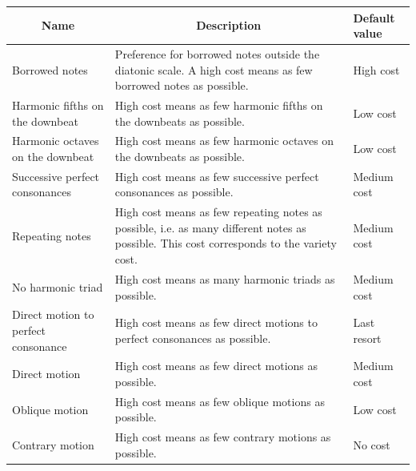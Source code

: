 \begin{table}[h!]
    \footnotesize
    \begin{adjustbox}{center}
        \begin{tabular}{|m{}|m{}|m{}<{\centering}|}
        \hline
        \multicolumn{1}{|c|}{\textbf{Name}} &
          \multicolumn{1}{c|}{\textbf{Description}} &
          \textbf{Default value} \\ \hline
        \cellcolor[HTML]{C8D6FF}Borrowed notes &
          Preference for borrowed notes outside the diatonic scale. A high cost means as few borrowed notes as possible. &
          High cost \\ \hline
        \cellcolor[HTML]{C8D6FF}Harmonic fifths on the downbeat &
          High cost means as few harmonic fifths on the downbeats as possible. &
          Low cost \\ \hline
        \cellcolor[HTML]{C8D6FF}Harmonic octaves on the downbeat &
          High cost means as few harmonic octaves on the downbeats as possible. &
          Low cost \\ \hline
        \cellcolor[HTML]{C8D6FF}Successive perfect consonances &
          High cost means as few successive perfect consonances as possible.&
          Medium cost \\ \hline
        \cellcolor[HTML]{C8D6FF}Repeating notes &
          High cost means as few repeating notes as possible, i.e. as many different notes as possible. This cost corresponds to the variety cost.&
          Medium cost \\ \hline
        \cellcolor[HTML]{C8D6FF}No harmonic triad &
          High cost means as many harmonic triads as possible.&
          Medium cost \\ \hline
        \cellcolor[HTML]{C8D6FF}Direct motion to perfect consonance &
          High cost means as few direct motions to perfect consonances as possible.&
          Last resort \\ \hline
        \cellcolor[HTML]{C8D6FF}Direct motion &
          High cost means as few direct motions as possible. &
          Medium cost \\ \hline
        \cellcolor[HTML]{C8D6FF}Oblique motion &
          High cost means as few oblique motions as possible. &
          Low cost \\ \hline
        \cellcolor[HTML]{C8D6FF}Contrary motion &
          High cost means as few contrary motions as possible. &
          No cost \\ \hline

\end{tabular}
\end{adjustbox}
\end{table}
